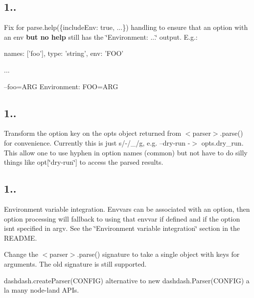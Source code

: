 \subsection*{1..}


\begin{DoxyItemize}
\item Fix for {\ttfamily parse.\+help(\{include\+Env\+: true, ...\})} handling to ensure that an option with an {\ttfamily env} {\bfseries but no {\ttfamily help}} still has the \char`\"{}\+Environment\+: ...\char`\"{} output. E.\+g.\+: \begin{DoxyVerb}  { names: ['foo'], type: 'string', env: 'FOO' }

  ...

  --foo=ARG      Environment: FOO=ARG
\end{DoxyVerb}

\end{DoxyItemize}

\subsection*{1..}


\begin{DoxyItemize}
\item Transform the option key on the {\ttfamily opts} object returned from {\ttfamily $<$parser$>$.parse()} for convenience. Currently this is just {\ttfamily s/-\//\+\_\+/g}, e.\+g. \textquotesingle{}--dry-\/run\textquotesingle{} -\/$>$ {\ttfamily opts.\+dry\+\_\+run}. This allow one to use hyphen in option names (common) but not have to do silly things like {\ttfamily opt\mbox{[}\char`\"{}dry-\/run\char`\"{}\mbox{]}} to access the parsed results.
\end{DoxyItemize}

\subsection*{1..}


\begin{DoxyItemize}
\item Environment variable integration. Envvars can be associated with an option, then option processing will fallback to using that envvar if defined and if the option isn\textquotesingle{}t specified in argv. See the \char`\"{}\+Environment variable
  integration\char`\"{} section in the R\+E\+A\+D\+ME.
\item Change the {\ttfamily $<$parser$>$.parse()} signature to take a single object with keys for arguments. The old signature is still supported.
\item {\ttfamily dashdash.\+create\+Parser(\+C\+O\+N\+F\+I\+G)} alternative to {\ttfamily new dashdash.\+Parser(\+C\+O\+N\+F\+I\+G)} a la many node-\/land A\+P\+Is.
\end{DoxyItemize}

